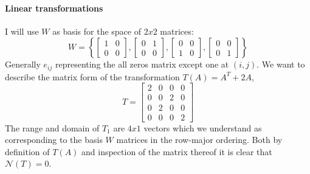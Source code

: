 \documentclass[10pt]{scrartcl}
\newcommand{\nullspace}{{\mathcal N}}
\begin{document}
\paragraph{Linear transformations} I will use $W$ as basis for the space of $2x2$ matrices:
\[W = \left\{\begin{bmatrix}1&0\\0&0\end{bmatrix},\begin{bmatrix}0&1\\0&0\end{bmatrix},\begin{bmatrix}0&0\\1&0\end{bmatrix},\begin{bmatrix}0&0\\0&1\end{bmatrix}\right\}\]
Generally $e_{ij}$ representing the all zeros matrix except one at $(i,j)$. We want to describe the matrix form of the transformation $T(A) = A^T + 2A$,
\[T = \begin{bmatrix}2&0& 0& 0\\0&0&2&0\\0&2&0&0\\0&0&0&2\end{bmatrix}\]
The range and domain of $T_1$ are $4x1$ vectors which we understand as corresponding to the basis $W$ matrices in the row-major ordering. Both by definition of $T(A)$ and inspection of the matrix thereof it is clear that $\nullspace{(T)} = 0$.
\end{document}
